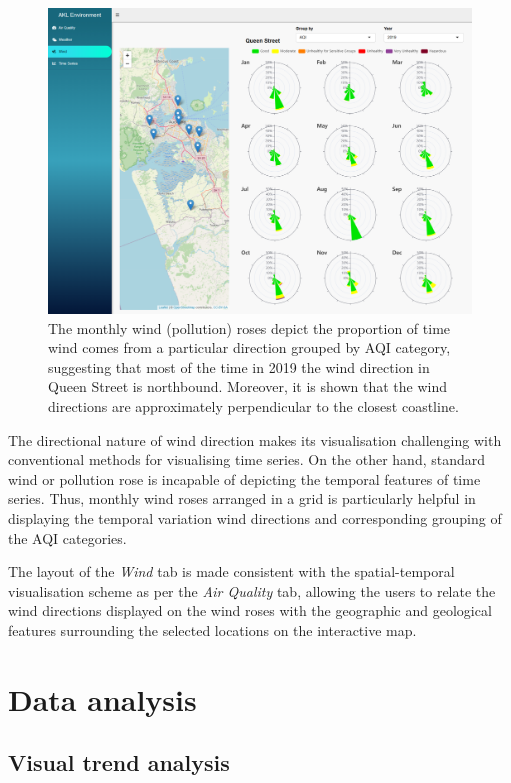 \documentclass{aucklandthesis}
\begin{document}
\begin{figure}
\includegraphics[width=1\linewidth]{figures/wind-tab} \caption{The monthly wind (pollution) roses depict the proportion of time wind comes from a particular direction grouped by AQI category, suggesting that most of the time in 2019 the wind direction in Queen Street is northbound. Moreover, it is shown that the wind directions are approximately perpendicular to the closest coastline.}\label{fig:unnamed-chunk-5}
\end{figure}



The directional nature of wind direction makes its visualisation challenging with conventional methods for visualising time series. On the other hand, standard wind or pollution rose is incapable of depicting the temporal features of time series. Thus, monthly wind roses arranged in a grid is particularly helpful in displaying the temporal variation wind directions and corresponding grouping of the AQI categories.

The layout of the \emph{Wind} tab is made consistent with the spatial-temporal visualisation scheme as per the \emph{Air Quality} tab, allowing the users to relate the wind directions displayed on the wind roses with the geographic and geological features surrounding the selected locations on the interactive map.

\hypertarget{data-analysis}{%
\section{Data analysis}\label{data-analysis}}

\hypertarget{sec:trend-viz}{%
\subsection{Visual trend analysis}\label{sec:trend-viz}}
\end{document}
